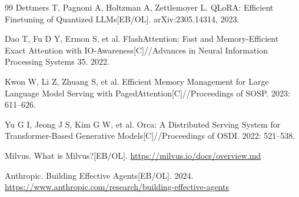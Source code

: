 \begin{thebibliography}{99}
 Dettmers T, Pagnoni A, Holtzman A, Zettlemoyer L. QLoRA: Efficient Finetuning of Quantized LLMs[EB/OL]. arXiv:2305.14314, 2023.

 Dao T, Fu D Y, Ermon S, et al. FlashAttention: Fast and Memory-Efficient Exact Attention with IO-Awareness[C]//Advances in Neural Information Processing Systems 35. 2022.

 Kwon W, Li Z, Zhuang S, et al. Efficient Memory Management for Large Language Model Serving with PagedAttention[C]//Proceedings of SOSP. 2023: 611--626.

 Yu G I, Jeong J S, Kim G W, et al. Orca: A Distributed Serving System for Transformer-Based Generative Models[C]//Proceedings of OSDI. 2022: 521--538.

 Milvus. What is Milvus?[EB/OL]. \url{https://milvus.io/docs/overview.md}

 Anthropic. Building Effective Agents[EB/OL]. 2024. \url{https://www.anthropic.com/research/building-effective-agents}

\end{thebibliography}
